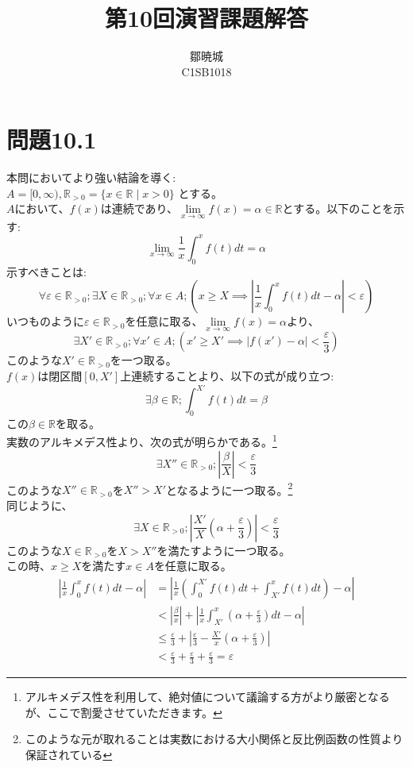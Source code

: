 \documentclass{jreport}
\begin{document}
\title{第10回演習課題解答}
\author{鄒暁城\\ C1SB1018}
\maketitle
\newpage
\tableofcontents
\newpage
\setcounter{chapter}{10}
\section{問題10.1}
\noindent 本問においてより強い結論を導く:\\
$A=[0,\infty ),\mathbb{R}_{>0} = \{x \in \mathbb{R} \mid x>0 \}$ とする。\\
$A$において、$f(x)$は連続であり、$\lim\limits_{x \to \infty} f(x) = \alpha \in \mathbb{R}$とする。以下のことを示す:
$$
\lim_{x \to \infty} \frac{1}{x} \int_0^x f(t)dt = \alpha
$$
示すべきことは:
$$
\forall \varepsilon \in \mathbb{R}_{>0} ;\exists X \in \mathbb{R}_{>0} ; \forall x \in A; \left( x \ge X \implies \left| \frac{1}{x} \int_0^x f(t) dt  - \alpha \right| < \varepsilon \right)
$$
いつものように$\varepsilon \in \mathbb{R}_{>0}$を任意に取る、$\lim\limits_{x \to \infty} f(x) = \alpha$より、
$$
\exists X' \in \mathbb{R}_{>0};\forall x' \in A ; \left( x' \ge X' \implies \left| f(x') - \alpha \right| < \frac{\varepsilon}{3 } \right)
$$
このような$X' \in \mathbb{R}_{>0} $を一つ取る。\\
$f(x)$は閉区間$[0,X']$上連続することより、以下の式が成り立つ:
$$
\exists \beta \in \mathbb{R}; \int_0^{X'} f(t)dt =\beta
$$
この$\beta \in \mathbb{R}$を取る。\\
実数のアルキメデス性より、次の式が明らかである。\footnote{アルキメデス性を利用して、絶対値について議論する方がより厳密となるが、ここで割愛させていただきます。} 
$$
\exists X'' \in \mathbb{R}_{>0}; \left| \frac{\beta}{X} \right| < \frac{\varepsilon}{3}
$$
このような$X'' \in \mathbb{R}_{>0}$を$X''> X'$となるように一つ取る。\footnote{このような元が取れることは実数における大小関係と反比例函数の性質より保証されている}\\
同じように、
$$
\exists X \in \mathbb{R}_{>0}; \left|  \frac{X'}{X} \left( \alpha + \frac{\varepsilon}{3} \right) \right| < \frac{\varepsilon}{3}
$$
このような$X \in \mathbb{R}_{>0}$を$X>X''$を満たすように一つ取る。\\
この時、$x \ge X$を満たす$x \in A$を任意に取る。\\
\begin{equation}
	\begin{aligned}
		\left| \frac{1}{x} \int_0^x f(t) dt -\alpha \right| & = \left| \frac{1}{x} \left( \int_0^{X'}  f(t) dt + \int_{X'}^x f(t) dt \right) -\alpha \right| \\
		&< \left| \frac{\beta}{x} \right| + \left| \frac{1}{x} \int_{X'}^x \left( \alpha +\frac{\varepsilon}{3} \right) dt - \alpha \right|\\
		&\le \frac{\varepsilon}{3} + \left| \frac{\varepsilon}{3} - \frac{X'}{x} \left( \alpha + \frac{\varepsilon}{3} \right) \right| \\
		&< \frac{\varepsilon}{3} + \frac{\varepsilon}{3} + \frac{\varepsilon}{3} =\varepsilon
	\end{aligned}
\end{equation}
\end{document}
